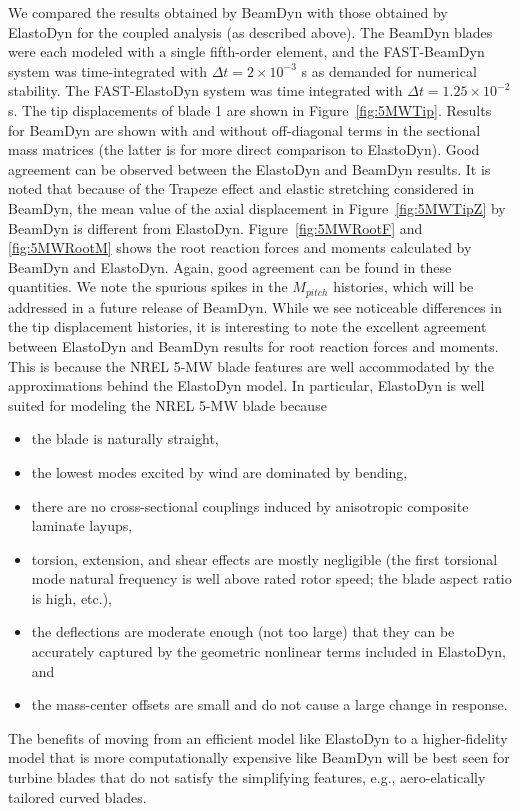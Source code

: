 \documentclass{aiaa-tc}
\begin{document}
We compared the results obtained by BeamDyn with those obtained by ElastoDyn for the coupled analysis (as described above).  The BeamDyn blades were each modeled with a single fifth-order element, and the FAST-BeamDyn system was time-integrated with $\Delta t = 2 \times 10^{-3}$ s as demanded for numerical stability.  
The FAST-ElastoDyn system was time integrated with $\Delta t = 1.25 \times 10^{-2}$ s.
The tip displacements of blade 1 are shown in Figure~\ref{fig:5MWTip}.  Results for BeamDyn are shown with and without off-diagonal terms in the sectional mass matrices (the latter is for more direct comparison to ElastoDyn).
Good agreement can be observed between the ElastoDyn and BeamDyn results. It is noted that because of the Trapeze effect and elastic stretching considered in BeamDyn, the mean value of the axial displacement in Figure~\ref{fig:5MWTipZ} by BeamDyn is different from ElastoDyn. Figure~\ref{fig:5MWRootF} and \ref{fig:5MWRootM} shows the root reaction forces and moments calculated by BeamDyn and ElastoDyn. Again, good agreement can be found in these quantities. We note the spurious spikes in the $M_{pitch}$ histories, which will be addressed in a future release of BeamDyn.  While we see noticeable differences in the tip displacement histories, it is interesting to note the excellent agreement between ElastoDyn and BeamDyn results for root reaction forces and moments.  This is because the NREL 5-MW blade features are well accommodated by the approximations behind the ElastoDyn model.  In particular, 
ElastoDyn is well suited for modeling the NREL 5-MW blade because
\begin{itemize}
\item the blade is naturally straight,
\item the lowest modes excited by wind are dominated by bending,
\item there are no cross-sectional couplings induced by anisotropic composite laminate layups,
\item torsion, extension, and shear effects are mostly negligible (the first torsional mode natural frequency is well above rated rotor speed; the blade aspect ratio is high, etc.),
\item the deflections are moderate enough (not too large) that they can be accurately captured by the geometric nonlinear terms included in ElastoDyn, and
\item the mass-center offsets are small and do not cause a large change in response.
\end{itemize}
The benefits of moving from an efficient model like ElastoDyn to a higher-fidelity model that is more computationally expensive like BeamDyn will be best seen for turbine blades that do not satisfy the simplifying features, e.g., aero-elatically tailored curved blades.\cite{Sri:SciTech2016}
\end{document}
